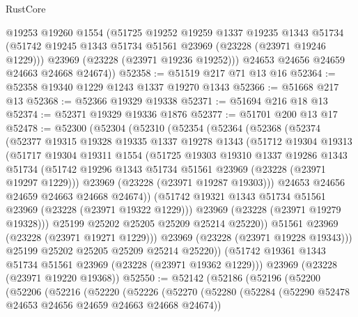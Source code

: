 \begin{lexlean}{RustCore}
\begin{coremodule}
        @19253
        @19260
        @1554
        (@51725
          @19252
          @19259
          @1337
          @19235
          @1343
          @51734
          (@51742 @19245 @1343 @51734 @51561 @23969 (@23228 (@23971 @19246 @1229)))
          @23969
          (@23228 (@23971 @19236 @19252)))
        @24653
        @24656
        @24659
        @24663
        @24668
        @24674))
@52358 := @51519 @217 @71 @13 @16
@52364 := @52358 @19340 @1229 @1243 @1337 @19270 @1343
@52366 := @51668 @217 @13
@52368 := @52366 @19329 @19338
@52371 := @51694 @216 @18 @13
@52374 := @52371 @19329 @19336 @1876
@52377 := @51701 @200 @13 @17
@52478 := @52300
    (@52304
      (@52310
        (@52354
          (@52364
            (@52368
              (@52374
                (@52377
                  @19315
                  @19328
                  @19335
                  @1337
                  @19278
                  @1343
                  (@51712
                    @19304
                    @19313
                    (@51717
                      @19304
                      @19311
                      @1554
                      (@51725
                        @19303
                        @19310
                        @1337
                        @19286
                        @1343
                        @51734
                        (@51742 @19296 @1343 @51734 @51561 @23969 (@23228 (@23971 @19297 @1229)))
                        @23969
                        (@23228 (@23971 @19287 @19303)))
                      @24653
                      @24656
                      @24659
                      @24663
                      @24668
                      @24674))
                  (@51742 @19321 @1343 @51734 @51561 @23969 (@23228 (@23971 @19322 @1229)))
                  @23969
                  (@23228 (@23971 @19279 @19328)))
                @25199
                @25202
                @25205
                @25209
                @25214
                @25220))
            @51561
            @23969
            (@23228 (@23971 @19271 @1229)))
          @23969
          (@23228 (@23971 @19228 @19343)))
        @25199
        @25202
        @25205
        @25209
        @25214
        @25220))
    (@51742 @19361 @1343 @51734 @51561 @23969 (@23228 (@23971 @19362 @1229)))
    @23969
    (@23228 (@23971 @19220 @19368))
@52550 := @52142
    (@52186
      (@52196
        (@52200
          (@52206
            (@52216
              (@52220
                (@52226
                  (@52270
                    (@52280
                      (@52284 (@52290 @52478 @24653 @24656 @24659 @24663 @24668 @24674))

\end{coremodule}
\end{lexlean}
